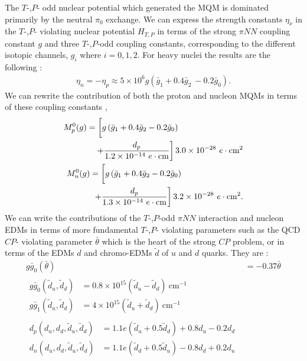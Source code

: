 \documentclass[8pt,a4paper, twoside]{report}
\begin{document}
The $T$-,$P$- odd nuclear potential which generated the MQM is dominated primarily by the neutral $\pi_0$ exchange. We can express the strength constants $\eta_{\nu}$ in the  $T$-,$P$- violating nuclear potential $H_{T,P}$  in terms of the strong $\pi NN$ coupling constant $g$ and three $T$-,$P$-odd coupling constants, corresponding to the different isotopic  channels,  $g_i$ where $i=0,1,2$. For heavy nuclei the results are the following  \cite{Dmitriev1994, SFK1984}:
\begin{align}
\eta_{n} = -\eta_{p} \approx 5\times 10^{6}g\left(\bar{g}_1 + 0.4 \bar{g}_2\ - 0.2\bar{g}_0\right) .
\end{align}
We can rewrite the contribution of both the proton and nucleon MQMs in terms of these coupling constants \cite{Flambaum1994, Vorov1995},
\begin{align} 
\begin{split}
M_{p}^0(g) &= \left[ \vphantom{\dfrac{1}{2}} g\left(\bar{g}_1 + 0.4\bar{g}_2 - 0.2\bar{g}_0\right) \right. \\
&\quad \left. + \dfrac{d_{p}}{1.2 \times 10^{-14} \ e\cdot\text{cm}}\right]3.0 \times 10^{-28} \ e\cdot\text{cm}^2 
\end{split}\label{eq:MQM_pion_p} \\
\begin{split}
M_{n}^0(g) &= \left[ \vphantom{\dfrac{1}{2}} g\left(\bar{g}_1 + 0.4\bar{g}_2 - 0.2\bar{g}_0\right) \right. \\
& \ \left. + \dfrac{d_{p}}{1.3 \times 10^{-14} \ e\cdot\text{cm}}\right]3.2 \times 10^{-28} \ e\cdot\text{cm}^2. 
\end{split} \label{eq:MQM_pion_n}
\end{align}
We can write the contributions of the $T$-,$P$-odd $\pi NN$ interaction and nucleon EDMs in terms of more fundamental $T$-,$P$- violating parameters such as the  QCD $CP$- violating parameter $\bar{\theta}$ which is the heart of the strong $CP$ problem,  or in terms of the EDMs  $d$ and chromo-EDMs $\tilde{d}$ of $u$ and $d$ quarks. They are \cite{ Crewther1979,Pospelov1999, Pospelov2005, Alexandrou2017, JLQCD, PNDME2018}:
\begin{align}
g\bar{g}_0(\bar{\theta})&= -0.37 \bar{\theta} \\
\begin{split}
g\bar{g}_0(\tilde{d}_u, \tilde{d}_d)&= 0.8\times 10^{15} \left(\tilde{d}_u - \tilde{d}_{d}\right) \ \text{cm}^{-1} \\
g\bar{g}_1(\tilde{d}_u, \tilde{d}_d)&= 4\times 10^{15} \left(\tilde{d}_u + \tilde{d}_{d}\right) \ \text{cm}^{-1}
\end{split} \label{eq:EDM_Chromo_1} \\
\begin{split}
d_{p}(d_u, d_d, \tilde{d}_u, \tilde{d}_d) &= 1.1e\left(\tilde{d}_u + 0.5\tilde{d}_{d}\right) + 0.8 d_u - 0.2d_d \\
d_{n}(d_u, d_d, \tilde{d}_u, \tilde{d}_d) &= 1.1e\left(\tilde{d}_d + 0.5\tilde{d}_{u}\right) - 0.8 d_d + 0.2d_u
\end{split} \label{eq:EDM_Chromo_2}
\end{align}
\end{document}
